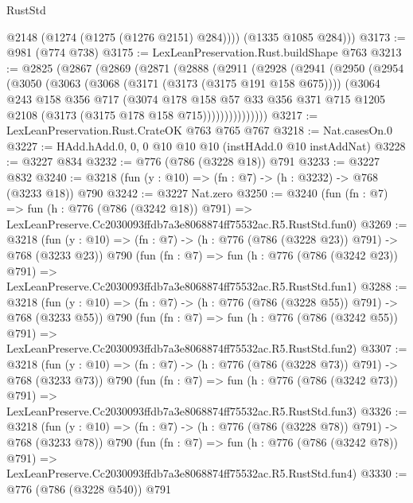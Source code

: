 \begin{lexlean}{RustStd}
\begin{coremodule}
            @2148
            (@1274 (@1275 (@1276 @2151) @284))))
        (@1335 @1085 @284)))
@3173 := @981 (@774 @738)
@3175 := LexLeanPreservation.Rust.buildShape @763
@3213 := @2825
    (@2867
      (@2869
        (@2871
          (@2888
            (@2911
              (@2928
                (@2941
                  (@2950
                    (@2954
                      (@3050
                        (@3063
                          (@3068 (@3171 (@3173 (@3175 @191 @158 @675))))
                          (@3064
                            @243
                            @158
                            @356
                            @717
                            (@3074
                              @178
                              @158
                              @57
                              @33
                              @356
                              @371
                              @715
                              @1205
                              @2108
                              (@3173 (@3175 @178 @158 @715)))))))))))))))
@3217 := LexLeanPreservation.Rust.CrateOK @763 @765 @767
@3218 := Nat.casesOn.{0}
@3227 := HAdd.hAdd.{0, 0, 0} @10 @10 @10 (instHAdd.{0} @10 instAddNat)
@3228 := @3227 @834
@3232 := @776 (@786 (@3228 @18)) @791
@3233 := @3227 @832
@3240 := @3218 (fun (y : @10) => (fn : @7) -> (h : @3232) -> @768 (@3233 @18)) @790
@3242 := @3227 Nat.zero
@3250 := @3240
    (fun (fn : @7) =>
    fun (h : @776 (@786 (@3242 @18)) @791) =>
    LexLeanPreserve.Cc2030093ffdb7a3e8068874ff75532ac.R5.RustStd.fun0)
@3269 := @3218
    (fun (y : @10) => (fn : @7) -> (h : @776 (@786 (@3228 @23)) @791) -> @768 (@3233 @23))
    @790
    (fun (fn : @7) =>
    fun (h : @776 (@786 (@3242 @23)) @791) =>
    LexLeanPreserve.Cc2030093ffdb7a3e8068874ff75532ac.R5.RustStd.fun1)
@3288 := @3218
    (fun (y : @10) => (fn : @7) -> (h : @776 (@786 (@3228 @55)) @791) -> @768 (@3233 @55))
    @790
    (fun (fn : @7) =>
    fun (h : @776 (@786 (@3242 @55)) @791) =>
    LexLeanPreserve.Cc2030093ffdb7a3e8068874ff75532ac.R5.RustStd.fun2)
@3307 := @3218
    (fun (y : @10) => (fn : @7) -> (h : @776 (@786 (@3228 @73)) @791) -> @768 (@3233 @73))
    @790
    (fun (fn : @7) =>
    fun (h : @776 (@786 (@3242 @73)) @791) =>
    LexLeanPreserve.Cc2030093ffdb7a3e8068874ff75532ac.R5.RustStd.fun3)
@3326 := @3218
    (fun (y : @10) => (fn : @7) -> (h : @776 (@786 (@3228 @78)) @791) -> @768 (@3233 @78))
    @790
    (fun (fn : @7) =>
    fun (h : @776 (@786 (@3242 @78)) @791) =>
    LexLeanPreserve.Cc2030093ffdb7a3e8068874ff75532ac.R5.RustStd.fun4)
@3330 := @776 (@786 (@3228 @540)) @791

\end{coremodule}
\end{lexlean}
